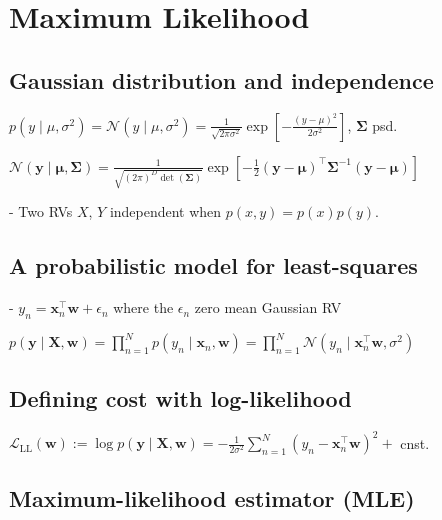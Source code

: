 \section{Maximum Likelihood}

\subsection*{Gaussian distribution and independence}

$p(y \mid \mu, \sigma^{2})=\mathcal{N}(y \mid \mu, \sigma^{2})=\frac{1}{\sqrt{2 \pi \sigma^{2}}} \exp [-\frac{(y-\mu)^{2}}{2 \sigma^{2}}]$,
$\boldsymbol{\Sigma}$ psd.

$\mathcal{N}(\mathbf{y} \mid \boldsymbol{\mu}, \boldsymbol{\Sigma})=\frac{1}{\sqrt{(2 \pi)^{D} \operatorname{det}(\boldsymbol{\Sigma})}} \exp [-\frac{1}{2}(\mathbf{y}-\boldsymbol{\mu})^{\top} \boldsymbol{\Sigma}^{-1}(\mathbf{y}-\boldsymbol{\mu})]$

- Two RVs $X$, $Y$ independent when $p(x, y)=p(x) p(y)$.

\subsection*{A probabilistic model for least-squares}

- $
y_{n}=\mathbf{x}_{n}^{\top} \mathbf{w}+\epsilon_{n}
$ where the $\epsilon_{n}$ zero mean Gaussian RV


$p(\mathbf{y} \mid \mathbf{X}, \mathbf{w})=\prod_{n=1}^{N} p(y_{n} \mid \mathbf{x}_{n}, \mathbf{w})=\prod_{n=1}^{N} \mathcal{N}(y_{n} \mid \mathbf{x}_{n}^{\top} \mathbf{w}, \sigma^{2})$


\subsection*{Defining cost with log-likelihood}

$\mathcal{L}_{\mathrm{LL}}(\mathbf{w}):=\log p(\mathbf{y} \mid \mathbf{X}, \mathbf{w})=-\frac{1}{2 \sigma^{2}} \sum_{n=1}^{N}(y_{n}-\mathbf{x}_{n}^{\top} \mathbf{w})^{2}+$ cnst.

\subsection*{Maximum-likelihood estimator (MLE)}

